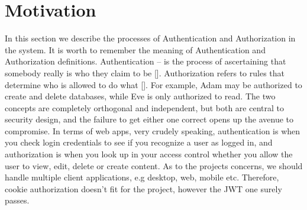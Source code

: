 \section{Motivation}\label{sec:motivation}
In this section we describe the processes of Authentication and Authorization in the system.
It is worth to remember the meaning of Authentication and Authorization definitions.
Authentication -- is the process of ascertaining that somebody really is who they claim to be [\cite{burrows1989logic}].
Authorization refers to rules that determine who is allowed to do what [\cite{fagin1978authorization}].
For example, Adam may be authorized to create and delete databases, while Eve is only authorized to read.
The two concepts are completely orthogonal and independent, but both are central to security design, and the
failure to get either one correct opens up the avenue to compromise.
In terms of web apps, very crudely speaking, authentication is when you check login credentials to see if you recognize
a user as logged in, and authorization is when you look up in your access control whether you allow the user to view,
edit, delete or create content.
As to the projects concerns, we should handle multiple client applications, e.g desktop,
web, mobile etc.
Therefore, cookie authorization doesn't fit for the project, however the JWT one surely passes.


